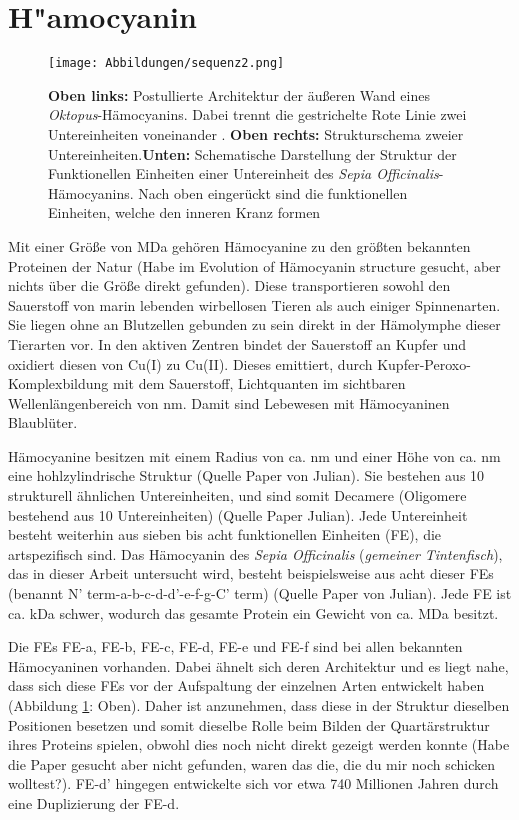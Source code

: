 \section{H"amocyanin}
\label{haemo}

\begin{figure}
	\texttt{[image: Abbildungen/sequenz2.png]}
	\caption[Schematische Darstellung eines Hämocyanins]{\textbf{Oben links:} Postullierte Architektur der äußeren Wand eines \textit{Oktopus}-Hämocyanins. Dabei trennt die gestrichelte Rote Linie zwei Untereinheiten voneinander \cite{julian_haemo}. \textbf{Oben rechts:} Strukturschema zweier Untereinheiten.\textbf{Unten:} Schematische Darstellung der Struktur der Funktionellen Einheiten einer Untereinheit des \textit{Sepia Officinalis}-Hämocyanins. Nach oben eingerückt sind die funktionellen Einheiten, welche den inneren Kranz formen}
	\label{seq}
\end{figure}


Mit einer Größe von \unit[3-8]{MDa} gehören Hämocyanine zu den größten bekannten Proteinen der Natur (Habe im Evolution of Hämocyanin structure gesucht, aber nichts über die Größe direkt gefunden).
Diese transportieren sowohl den Sauerstoff von marin lebenden wirbellosen Tieren als auch einiger Spinnenarten.
Sie liegen ohne an Blutzellen gebunden zu sein direkt in der Hämolymphe dieser Tierarten vor.
In den aktiven Zentren bindet der Sauerstoff an Kupfer und oxidiert diesen von Cu(I) zu Cu(II).
Dieses emittiert, durch Kupfer-Peroxo-Komplexbildung mit dem Sauerstoff, Lichtquanten im sichtbaren Wellenlängenbereich von \unit[480-420]{nm}.
Damit sind Lebewesen mit Hämocyaninen Blaublüter.\cite{komplex}

Hämocyanine besitzen mit einem Radius von ca. \unit[35]{nm} und einer Höhe von ca. \unit[15]{nm} eine hohlzylindrische Struktur (Quelle Paper von Julian).
Sie bestehen aus 10 strukturell ähnlichen Untereinheiten, und sind somit Decamere (Oligomere bestehend aus 10 Untereinheiten) (Quelle Paper Julian). 
Jede Untereinheit besteht weiterhin aus sieben bis acht funktionellen Einheiten (FE), die artspezifisch sind.
Das Hämocyanin des \textit{Sepia Officinalis} (\textit{gemeiner Tintenfisch}), das in dieser Arbeit untersucht wird, besteht beispielsweise aus acht dieser FEs (benannt N' term-a-b-c-d-d'-e-f-g-C' term) (Quelle Paper von Julian).
Jede FE ist ca. \unit[50]{kDa} schwer, wodurch das gesamte Protein ein Gewicht von ca. \unit[4]{MDa} besitzt.

Die FEs FE-a, FE-b, FE-c, FE-d, FE-e und FE-f sind bei allen bekannten Hämocyaninen vorhanden.
Dabei ähnelt sich deren Architektur und es liegt nahe, dass sich diese FEs vor der Aufspaltung der einzelnen Arten entwickelt haben (Abbildung \ref{seq}: Oben).
Daher ist anzunehmen, dass diese in der Struktur dieselben Positionen besetzen und somit dieselbe Rolle beim Bilden der Quartärstruktur ihres Proteins spielen, obwohl dies noch nicht direkt gezeigt werden konnte (Habe die Paper gesucht aber nicht gefunden, waren das die, die du mir noch schicken wolltest?).
FE-d' hingegen entwickelte sich vor etwa 740 Millionen Jahren durch eine Duplizierung der FE-d. \cite{christos_diss}

